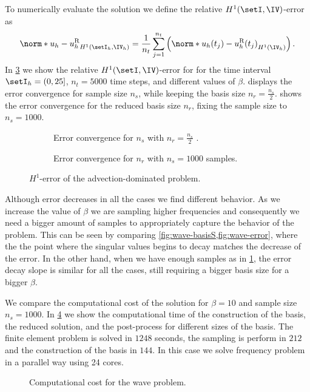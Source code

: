 To numerically evaluate the solution we define the relative $H^1(\setI,\IV)$-error as
\begin{equation} \label{eq:H1-error}
    \norm*{u_h - u_h^{\textrm{R}}}_{H^1({\setI_h,\IV_h})} = \frac{1}{n_t} \sum_{j=1}^{n_t} \left( \norm*{u_h(t_j) - u_h^{\textrm{R}}(t_j)}_{H^1({\IV_h})} \right).
\end{equation}
In \cref{fig:wave-error} we show the relative $H^1(\setI,\IV)$-error for for the time interval $\setI_h=(0,25]$, $n_t=5000$ time steps, and different values of $\beta$.  displays the error convergence for sample size $n_s$, while keeping the basis size $n_r=\frac{n_s}{2}$.  shows the error convergence for the reduced basis size $n_r$, fixing the sample size to $n_s=1000$.
\begin{figure}[H]
	\centering
    \begin{subfigure}[htb!]{0.49\textwidth}
     	\centering
        
        \caption{Error convergence for $n_s$ with $n_r=\frac{n_s}{2}$ .} 
	    \label{fig:wave-error-ns}
    \end{subfigure}
    \begin{subfigure}[htb!]{0.49\textwidth}
     	\centering
        
        \caption{Error convergence for $n_r$ with $n_s=1000$ samples.} 
	    \label{fig:wave-error-nr}
    \end{subfigure}
    \caption{$H^1$-error of the advection-dominated problem.}
	\label{fig:wave-error}
\end{figure}

Although error decreases in all the cases we find different behavior. As we increase the value of $\beta$ we are sampling higher frequencies and consequently we need a bigger amount of samples to appropriately capture the behavior of the problem. This can be seen by comparing \cref{fig:wave-basisS,fig:wave-error}, where the the point where the singular values begins to decay matches the decrease of the error. In the other hand, when we have enough samples as in \cref{fig:wave-error-ns}, the error decay slope is similar for all the cases, still requiring a bigger basis size for a bigger $\beta$.

We compare the computational cost of the solution for $\beta=10$ and sample size $n_s=1000$. In \cref{fig:wave-time} we show the computational time of the construction of the basis, the reduced solution, and the post-process for different sizes of the basis. The finite element problem is solved in $1248$ seconds, the sampling is perform in $212$ and the construction of the basis in $144$. In this case we solve frequency problem in a parallel way using 24 cores.
\begin{figure}[H]
	\centering
    
    \caption{Computational cost for the wave problem.}
	\label{fig:wave-time}
\end{figure}

